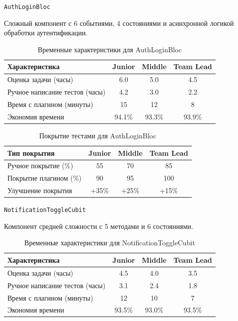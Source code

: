 \documentclass[14pt, russian]{scrartcl}
\begin{document}
\texttt{AuthLoginBloc}

Сложный компонент с 6 событиями, 4 состояниями и асинхронной логикой обработки аутентификации.

\begin{table}[h!]
\centering
\begin{tabular}{|l|c|c|c|}
\hline
Характеристика & Junior & Middle & Team Lead \\
\hline
Оценка задачи (часы) & 6.0 & 5.0 & 4.5 \\
Ручное написание тестов (часы) & 4.2 & 3.0 & 2.2 \\
Время с плагином (минуты) & 15 & 12 & 8 \\
Экономия времени & 94.1\% & 93.3\% & 93.9\% \\
\hline
\end{tabular}
\vspace{1ex}
\caption{Временные характеристики для AuthLoginBloc}
\end{table}

\begin{table}[h!]
\centering
\begin{tabular}{|l|c|c|c|}
\hline
Тип покрытия & Junior & Middle & Team Lead \\
\hline
Ручное покрытие (\%) & 55 & 70 & 85 \\
Покрытие плагином (\%) & 90 & 95 & 100 \\
Улучшение покрытия & +35\% & +25\% & +15\% \\
\hline
\end{tabular}
\vspace{1ex}
\caption{Покрытие тестами для AuthLoginBloc}
\end{table}

\texttt{NotificationToggleCubit}

Компонент средней сложности с 5 методами и 6 состояниями.

\begin{table}[h!]
\centering
\begin{tabular}{|l|c|c|c|}
\hline
Характеристика & Junior & Middle & Team Lead \\
\hline
Оценка задачи (часы) & 4.5 & 4.0 & 3.5 \\
Ручное написание тестов (часы) & 3.1 & 2.4 & 1.8 \\
Время с плагином (минуты) & 12 & 10 & 7 \\
Экономия времени & 93.5\% & 93.0\% & 93.5\% \\
\hline
\end{tabular}
\vspace{1ex}
\caption{Временные характеристики для NotificationToggleCubit}
\end{table}
\end{document}

